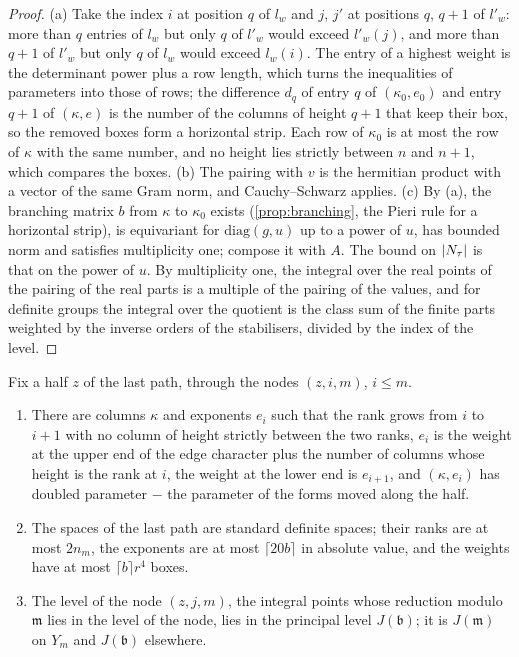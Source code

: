 \begin{proof}
(a) Take the index $i$ at position $q$ of $l_w$ and $j$, $j'$ at positions $q$, $q+1$ of $l'_w$: more than $q$ entries of $l_w$ but only $q$ of $l'_w$ would exceed $l'_w(j)$, and more than $q+1$ of $l'_w$ but only $q$ of $l_w$ would exceed $l_w(i)$.
The entry of a highest weight is the determinant power plus a row length, which turns the inequalities of parameters into those of rows; the difference $d_q$ of entry $q$ of $(\kappa_0,e_0)$ and entry $q+1$ of $(\kappa,e)$ is the
number of the columns of height $q+1$ that keep their box, so the removed boxes form a horizontal strip. Each row of $\kappa_0$ is at most the row of $\kappa$ with the same number, and no height lies strictly between $n$
and $n+1$, which compares the boxes. (b) The pairing with $v$ is the hermitian product with a vector of the same Gram norm, and Cauchy--Schwarz applies. (c) By (a), the branching matrix $b$ from $\kappa$ to $\kappa_0$ exists
(\cref{prop:branching}, the Pieri rule for a horizontal strip), is equivariant for $\mathrm{diag}(g,u)$ up to a power of $u$, has bounded norm and satisfies multiplicity one; compose it with $A$. The bound on $\lvert N_\tau\rvert$ is that on the power of
$u$. By multiplicity one, the integral over the real points of the pairing of the real parts is a multiple of the pairing of the values, and for definite groups the integral over the quotient is the class sum of the
finite parts weighted by the inverse orders of the stabilisers, divided by the index of the level.
\end{proof}

\begin{lemma}\label{lem:last-weights}
Fix a half $z$ of the last path, through the nodes $(z,i,m)$, $i\le m$.
\begin{enumerate}[label=\textup{(\alph*)}]
\item There are columns $\kappa$ and exponents $e_i$ such that the rank grows from $i$ to $i+1$ with no column of height strictly between the two ranks, $e_i$ is the weight at the upper end of the edge character plus the number of
columns whose height is the rank at $i$, the weight at the lower end is $e_{i+1}$, and $(\kappa,e_i)$ has doubled parameter $-$ the parameter of the forms moved along the half.
\item The spaces of the last path are standard definite spaces; their ranks are at most $2n_m$, the exponents are at most $\lceil20b\rceil$ in absolute value, and the weights have at most $\lceil b\rceil r^4$ boxes.
\item The level of the node $(z,j,m)$, the integral points whose reduction modulo $\mathfrak m$ lies in the level of the node, lies in the principal level $J(\mathfrak b)$; it is $J(\mathfrak m)$ on $Y_m$ and $J(\mathfrak b)$ elsewhere.
\end{enumerate}
\end{lemma}

